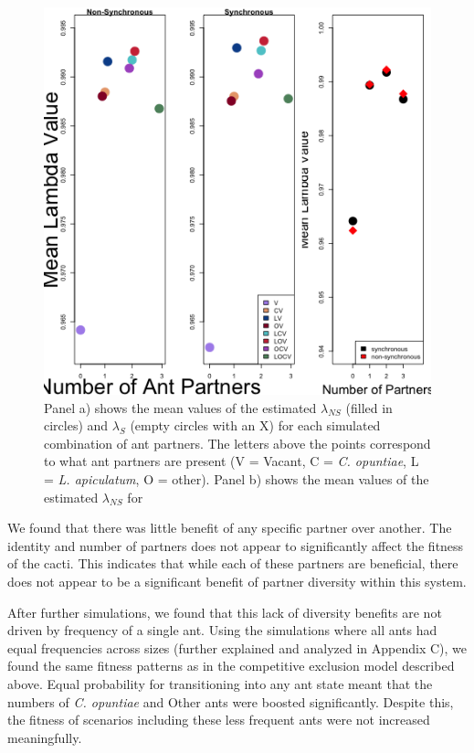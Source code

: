 \documentclass[11pt]{article}
\begin{document}
\begin{figure}
	\includegraphics[width=0.91\linewidth]{Figures/Lambdas_Comp_Full.png}
	\caption{Panel a) shows the mean values of the estimated $\lambda_{NS}$ (filled in circles) and $\lambda_{S}$ (empty circles with an X) for each simulated combination of ant partners. The letters above the points correspond to what ant partners are present (V = Vacant, C = \textit{C. opuntiae}, L = \textit{L. apiculatum}, O = other). Panel b) shows the mean values of the estimated $\lambda_{NS}$ for }
	\label{fig:LambdaMeans}
\end{figure}

We found that there was little benefit of any specific partner over another.
The identity and number of partners does not appear to significantly affect the fitness of the cacti. 
This indicates that while each of these partners are beneficial, there does not appear to be a significant benefit of partner diversity within this system. 

After further simulations, we found that this lack of diversity benefits are not driven by frequency of a single ant. 
Using the simulations where all ants had equal frequencies across sizes (further explained and analyzed in Appendix C), we found the same fitness patterns as in the competitive exclusion model described above.
Equal probability for transitioning into any ant state meant that the numbers of \textit{C. opuntiae} and Other ants were boosted significantly.
Despite this, the fitness of scenarios including these less frequent ants were not increased meaningfully.
\end{document}
